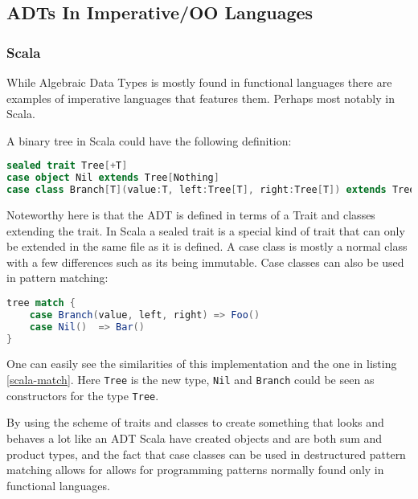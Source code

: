 \documentclass[10pt]{report}
\def\code#1{\texttt{#1}} %
\begin{document}
\subsection{ADTs In Imperative/OO Languages}
\subsubsection{Scala}


\par{While Algebraic Data Types is mostly found in functional languages there are examples of imperative languages that features them. Perhaps most notably in Scala.}
\par{A binary tree in Scala could have the following definition:}

\begin{lstlisting}[language=Scala,caption={ADT definition in Scala},label={lst:e4c_syntax}]
sealed trait Tree[+T]
case object Nil extends Tree[Nothing]
case class Branch[T](value:T, left:Tree[T], right:Tree[T]) extends Tree[T]
\end{lstlisting}
\par{Noteworthy here is that the ADT is defined in terms of a Trait and classes extending the trait. In Scala a sealed trait is a special kind of trait that can only be extended in the same file as it is defined. A case class is mostly a normal class with a few differences such as its being immutable\cite{ScalaCase}. Case classes can also be used in pattern matching:}
\begin{lstlisting}[language=Scala,caption={Pattern matching on an ADT in Scala},label=scala-match]
tree match {
    case Branch(value, left, right) => Foo()
    case Nil()  => Bar()
}
\end{lstlisting}
\par{One can easily see the similarities of this implementation and the one in listing \ref{scala-match}. Here \code{Tree} is the new type, \code{Nil} and \code{Branch} could be seen as constructors for the type \code{Tree}.}
\par{By using the scheme of traits and classes to create something that looks and behaves a lot like an ADT Scala have created objects and are both sum and product types, and the fact that case classes can be used in destructured pattern matching allows for allows for programming patterns normally found only in functional languages.}
\end{document}
